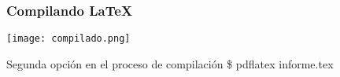 \begin{frame}
   \frametitle{Compilando \LaTeX{}}
   \texttt{[image: compilado.png]}
   \vspace{0.9cm}\\
    
            \centering
            \begin{exampleblock}{Segunda opci\'on en el proceso de compilaci\'on} %
                {\ttfamily \$ pdflatex informe.tex }                                       
            \end{exampleblock}            
       
        
       
\end{frame}

